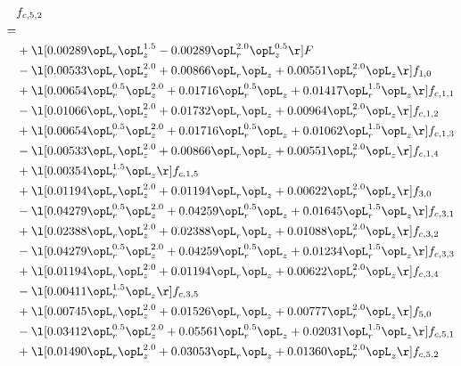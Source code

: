 \begin{alignat}{2} 
\label{eq:f_52_1} 
& f_{c,5,2} \nonumber \\ 
 = \\ 
& + \l[  0.00289 \opL_r \opL_z^{1.5}   -0.00289 \opL_r^{2.0} \opL_z^{0.5}  \r] F \nonumber \\ 
& - \l[  0.00533 \opL_r \opL_z^{2.0} +  0.00866 \opL_r \opL_z +  0.00551 \opL_r^{2.0} \opL_z  \r] f_{1,0} \nonumber \\ 
& + \l[  0.00654 \opL_r^{0.5} \opL_z^{2.0} +  0.01716 \opL_r^{0.5} \opL_z +  0.01417 \opL_r^{1.5} \opL_z  \r] f_{c,1,1} \nonumber \\ 
& - \l[  0.01066 \opL_r \opL_z^{2.0} +  0.01732 \opL_r \opL_z +  0.00964 \opL_r^{2.0} \opL_z  \r] f_{c,1,2} \nonumber \\ 
& + \l[  0.00654 \opL_r^{0.5} \opL_z^{2.0} +  0.01716 \opL_r^{0.5} \opL_z +  0.01062 \opL_r^{1.5} \opL_z  \r] f_{c,1,3} \nonumber \\ 
& - \l[  0.00533 \opL_r \opL_z^{2.0} +  0.00866 \opL_r \opL_z +  0.00551 \opL_r^{2.0} \opL_z  \r] f_{c,1,4} \nonumber \\ 
& + \l[  0.00354 \opL_r^{1.5} \opL_z  \r] f_{c,1,5} \nonumber \\ 
& + \l[  0.01194 \opL_r \opL_z^{2.0} +  0.01194 \opL_r \opL_z +  0.00622 \opL_r^{2.0} \opL_z  \r] f_{3,0} \nonumber \\ 
& - \l[  0.04279 \opL_r^{0.5} \opL_z^{2.0} +  0.04259 \opL_r^{0.5} \opL_z +  0.01645 \opL_r^{1.5} \opL_z  \r] f_{c,3,1} \nonumber \\ 
& + \l[  0.02388 \opL_r \opL_z^{2.0} +  0.02388 \opL_r \opL_z +  0.01088 \opL_r^{2.0} \opL_z  \r] f_{c,3,2} \nonumber \\ 
& - \l[  0.04279 \opL_r^{0.5} \opL_z^{2.0} +  0.04259 \opL_r^{0.5} \opL_z +  0.01234 \opL_r^{1.5} \opL_z  \r] f_{c,3,3} \nonumber \\ 
& + \l[  0.01194 \opL_r \opL_z^{2.0} +  0.01194 \opL_r \opL_z +  0.00622 \opL_r^{2.0} \opL_z  \r] f_{c,3,4} \nonumber \\ 
& - \l[  0.00411 \opL_r^{1.5} \opL_z  \r] f_{c,3,5} \nonumber \\ 
& + \l[  0.00745 \opL_r \opL_z^{2.0} +  0.01526 \opL_r \opL_z +  0.00777 \opL_r^{2.0} \opL_z  \r] f_{5,0} \nonumber \\ 
& - \l[  0.03412 \opL_r^{0.5} \opL_z^{2.0} +  0.05561 \opL_r^{0.5} \opL_z +  0.02031 \opL_r^{1.5} \opL_z  \r] f_{c,5,1} \nonumber \\ 
& + \l[  0.01490 \opL_r \opL_z^{2.0} +  0.03053 \opL_r \opL_z +  0.01360 \opL_r^{2.0} \opL_z  \r] f_{c,5,2} \nonumber \\ 

\end{alignat}
